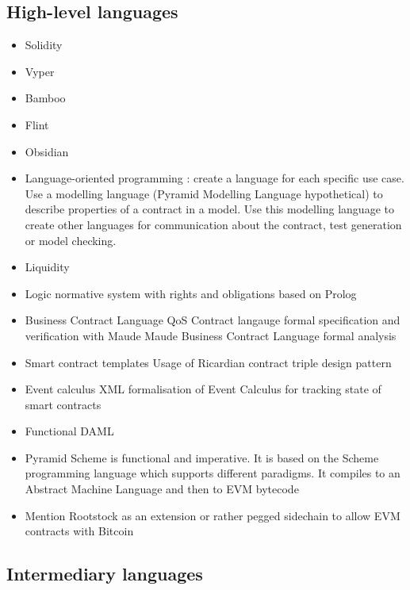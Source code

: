 \documentclass{llncs}
\begin{document}
\subsection{High-level languages}
\begin{itemize}
\item Solidity \cite{Ethereum2018Solidity}
\item Vyper \cite{Ethereum2018Vyper}
\item Bamboo \cite{Hirai2018Bamboo}
\item Flint \cite{Schrans2018}
\item Obsidian \cite{Coblenz2017}
\item Language-oriented programming \cite{Burge2018DSL}: create a language for each specific use case. Use a modelling language (Pyramid Modelling Language hypothetical) to describe properties of a contract in a model. Use this modelling language to create other languages for communication about the contract, test generation or model checking.
\item Liquidity \cite{OCamlProSAS2018}
\item Logic normative system with rights and obligations based on Prolog \cite{Michael2010}
\item Business Contract Language \cite{Neal.2003} QoS Contract langauge formal specification and verification with Maude \cite{Braga2009} Maude \cite{Clavel2007} Business Contract Language formal analysis \cite{Governatori2006}
\item Smart contract templates Usage of Ricardian contract triple design pattern \cite{Clack2016}
\item Event calculus XML formalisation of Event Calculus for tracking state of smart contracts \cite{Farrell2004}
\item Functional DAML \cite{Shaul2018,Meier2018,Lippmeier2018,Huschenbett2018,Bernauer2018,Maric2018,Bleikertz2018,Lochbihler2018,Pilav2018}
\item Pyramid Scheme \cite{Burge2018} is functional and imperative. It is based on the Scheme programming language which supports different paradigms. It compiles to an Abstract Machine Language and then to EVM bytecode
\item Mention Rootstock as an extension or rather pegged sidechain to allow EVM contracts with Bitcoin \cite{Lerner2015}
\end{itemize}

\subsection{Intermediary languages}
\end{document}
